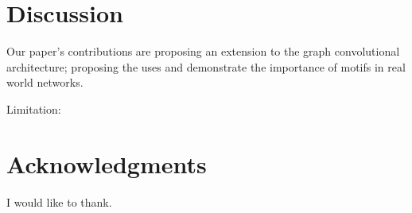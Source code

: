 \documentclass{article}
\theoremstyle{definition}
\begin{document}
\section{Discussion}

Our paper's contributions are proposing an extension to the graph convolutional 
architecture; proposing the uses and demonstrate the importance of motifs in
real world networks.

Limitation: 


\section*{Acknowledgments}

I would like to thank.



\end{document}
